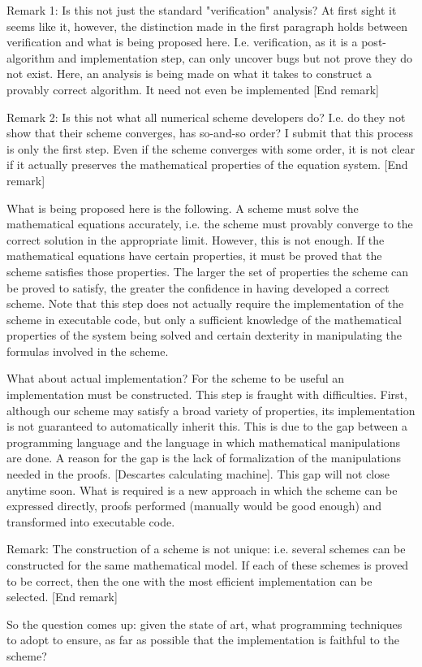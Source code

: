 \documentclass[11pt, reqno]{amsart}
\theoremstyle{definition}
\begin{document}
Remark 1: Is this not just the standard "verification" analysis? At
first sight it seems like it, however, the distinction made in the
first paragraph holds between verification and what is being proposed
here. I.e. verification, as it is a post-algorithm and implementation
step, can only uncover bugs but not prove they do not exist. Here, an
analysis is being made on what it takes to construct a provably
correct algorithm. It need not even be implemented [End remark]

Remark 2: Is this not what all numerical scheme developers do?
I.e. do they not show that their scheme converges, has so-and-so
order? I submit that this process is only the first step. Even if the
scheme converges with some order, it is not clear if it actually
preserves the mathematical properties of the equation system. [End
remark]

What is being proposed here is the following. A scheme must solve the
mathematical equations accurately, i.e. the scheme must provably
converge to the correct solution in the appropriate limit. However,
this is not enough. If the mathematical equations have certain
properties, it must be proved that the scheme satisfies those
properties. The larger the set of properties the scheme can be proved
to satisfy, the greater the confidence in having developed a correct
scheme. Note that this step does not actually require the
implementation of the scheme in executable code, but only a sufficient
knowledge of the mathematical properties of the system being solved
and certain dexterity in manipulating the formulas involved in the
scheme.

What about actual implementation? For the scheme to be useful an
implementation must be constructed. This step is fraught with
difficulties. First, although our scheme may satisfy a broad variety
of properties, its implementation is not guaranteed to automatically
inherit this. This is due to the gap between a programming language
and the language in which mathematical manipulations are done. A
reason for the gap is the lack of formalization of the manipulations
needed in the proofs. [Descartes calculating machine]. This gap will
not close anytime soon. What is required is a new approach in which
the scheme can be expressed directly, proofs performed (manually would
be good enough) and transformed into executable code.

Remark: The construction of a scheme is not unique: i.e. several
schemes can be constructed for the same mathematical model. If each of
these schemes is proved to be correct, then the one with the most
efficient implementation can be selected. [End remark]

So the question comes up: given the state of art, what programming
techniques to adopt to ensure, as far as possible that the
implementation is faithful to the scheme?
\end{document}
